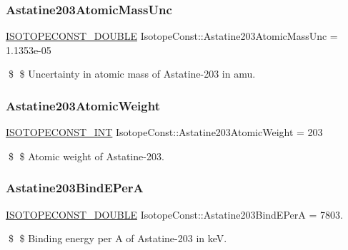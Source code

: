 \subsubsection{\texorpdfstring{Astatine203\+Atomic\+Mass\+Unc}{Astatine203AtomicMassUnc}}
{\footnotesize\ttfamily \mbox{\hyperlink{group___isotope_const-_macros_ga8f45a7272ce02c0b4c65c44636ed719a}{I\+S\+O\+T\+O\+P\+E\+C\+O\+N\+S\+T\+\_\+\+D\+O\+U\+B\+LE}} Isotope\+Const\+::\+Astatine203\+Atomic\+Mass\+Unc = 1.\+1353e-\/05}

\$ \$ Uncertainty in atomic mass of Astatine-\/203 in amu. \mbox{\label{group___isotope_const-_astatine-_at203_ga69594decdae59cc40e67fe0effad1c65}} 
\subsubsection{\texorpdfstring{Astatine203\+Atomic\+Weight}{Astatine203AtomicWeight}}
{\footnotesize\ttfamily \mbox{\hyperlink{group___isotope_const-_macros_ga5f18360b3e99483a35c32d789e62621c}{I\+S\+O\+T\+O\+P\+E\+C\+O\+N\+S\+T\+\_\+\+I\+NT}} Isotope\+Const\+::\+Astatine203\+Atomic\+Weight = 203}

\$ \$ Atomic weight of Astatine-\/203. \mbox{\label{group___isotope_const-_astatine-_at203_gac387cb10526cc8bb450be8cf51b0e5f9}} 
\subsubsection{\texorpdfstring{Astatine203\+Bind\+E\+PerA}{Astatine203BindEPerA}}
{\footnotesize\ttfamily \mbox{\hyperlink{group___isotope_const-_macros_ga8f45a7272ce02c0b4c65c44636ed719a}{I\+S\+O\+T\+O\+P\+E\+C\+O\+N\+S\+T\+\_\+\+D\+O\+U\+B\+LE}} Isotope\+Const\+::\+Astatine203\+Bind\+E\+PerA = 7803.}

\$ \$ Binding energy per A of Astatine-\/203 in keV. \mbox{\label{group___isotope_const-_astatine-_at203_ga1da4be166429856d528a20918f473ee7}} 
